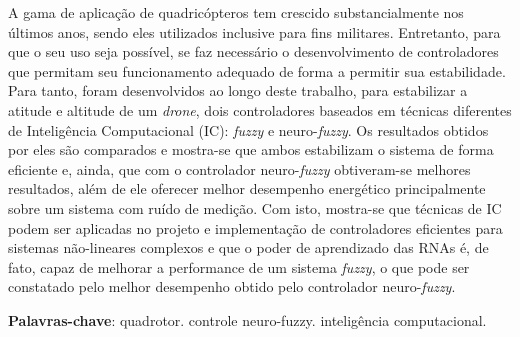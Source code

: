 %
%
\begin{resumo}

A gama de aplicação de quadricópteros tem crescido substancialmente nos últimos anos, sendo eles utilizados inclusive para fins militares. Entretanto, para que o seu uso seja possível, se faz necessário o desenvolvimento de controladores que permitam seu funcionamento adequado de forma a permitir sua estabilidade. Para tanto, foram desenvolvidos ao longo deste trabalho, para estabilizar a atitude e altitude de um \textit{drone}, dois controladores baseados em técnicas diferentes de Inteligência Computacional (IC): \textit{fuzzy} e neuro-\textit{fuzzy}. Os resultados obtidos por eles são comparados e mostra-se que ambos estabilizam o sistema de forma eficiente e, ainda, que com o controlador neuro-\textit{fuzzy} obtiveram-se melhores resultados, além de ele oferecer melhor desempenho energético principalmente sobre um sistema com ruído de medição. Com isto, mostra-se que técnicas de IC podem ser aplicadas no projeto e implementação de controladores eficientes para sistemas não-lineares complexos e que o poder de aprendizado das RNAs é, de fato, capaz de melhorar a performance de um sistema \textit{fuzzy}, o que pode ser constatado pelo melhor desempenho obtido pelo controlador neuro-\textit{fuzzy}.


\textbf{Palavras-chave}: quadrotor. controle neuro-fuzzy. inteligência computacional.

\end{resumo}

